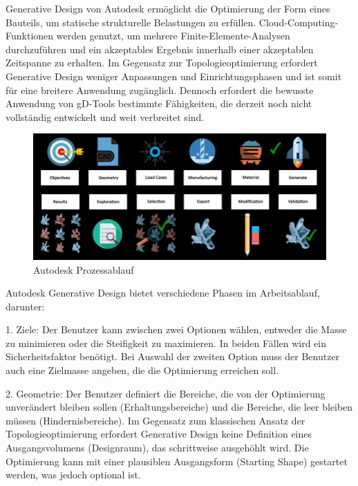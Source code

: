 Generative Design von Autodesk ermöglicht die Optimierung der Form eines Bauteils, um statische strukturelle Belastungen zu erfüllen. Cloud-Computing-Funktionen werden genutzt, um mehrere Finite-Elemente-Analysen durchzuführen und ein akzeptables Ergebnis innerhalb einer akzeptablen Zeitspanne zu erhalten. Im Gegensatz zur Topologieoptimierung erfordert Generative Design weniger Anpassungen und Einrichtungsphasen und ist somit für eine breitere Anwendung zugänglich. Dennoch erfordert die bewusste Anwendung von \ac*{gD}-Tools bestimmte Fähigkeiten, die derzeit noch nicht vollständig entwickelt und weit verbreitet sind. 



\begin{figure}[h]
    \begin{minipage}{0.5\textwidth}
      \centering
      \includegraphics[width=\textwidth]{./images/Autodesk-Generative-Design-Framework.jpeg}
    \end{minipage}
    \caption{Autodesk Prozessablauf}
    \label{fig:meinbild}
  \end{figure}
  

Autodesk Generative Design bietet verschiedene Phasen im Arbeitsablauf, darunter:

1. Ziele: Der Benutzer kann zwischen zwei Optionen wählen, entweder die Masse zu minimieren oder die Steifigkeit zu maximieren. In beiden Fällen wird ein Sicherheitsfaktor benötigt. Bei Auswahl der zweiten Option muss der Benutzer auch eine Zielmasse angeben, die die Optimierung erreichen soll.

2. Geometrie: Der Benutzer definiert die Bereiche, die von der Optimierung unverändert bleiben sollen (Erhaltungsbereiche) und die Bereiche, die leer bleiben müssen (Hindernisbereiche). Im Gegensatz zum klassischen Ansatz der Topologieoptimierung erfordert Generative Design keine Definition eines Ausgangsvolumens (Designraum), das schrittweise ausgehöhlt wird. Die Optimierung kann mit einer plausiblen Ausgangsform (Starting Shape) gestartet werden, was jedoch optional ist.

